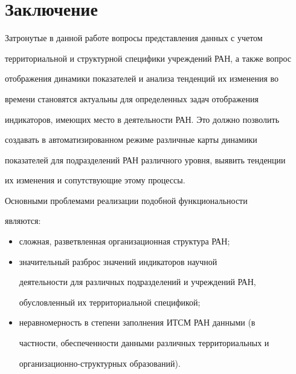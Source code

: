 \vspace*{-6pt}


     


     \section{Заключение}


     


     \vspace*{-1pt}


     


     Затронутые в данной работе вопросы представления данных с учетом 


территориальной и структурной специфики учреждений РАН, а также вопрос 


отображения динамики показателей и анализа тенденций их изменения во 


времени становятся актуальны для определенных задач отображения 


индикаторов, имеющих место в деятельности РАН. Это должно позволить 


создавать в автоматизированном режиме различные карты динамики 


показателей для подразделений РАН различного уровня, выявить тенденции 


их изменения и сопутствующие этому процессы.


     


     Основными проблемами реализации подобной функциональности 


являются:


     \begin{itemize} %


     \item сложная, разветвленная организационная структура РАН;


     \item значительный разброс значений индикаторов научной 


деятельности  для различных подразделений и учреждений РАН, 


обусловленный их территориальной спецификой;


     \item неравномерность в степени заполнения ИТСМ РАН данными (в 


частности, обеспеченности данными различных территориальных и 


организационно-структурных образований).


     \end{itemize}



